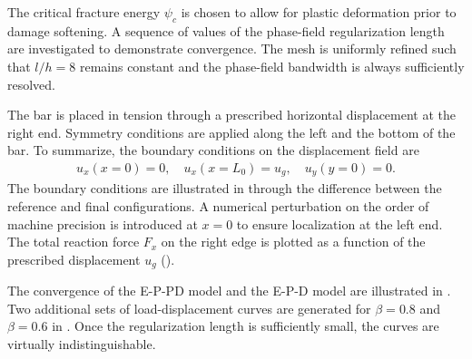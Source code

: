 The critical fracture energy $\psi_c$ is chosen to allow for plastic deformation prior to damage softening. A sequence of values of the phase-field regularization length are investigated to demonstrate convergence. The mesh is uniformly refined such that $l/h = 8$ remains constant and the phase-field bandwidth is always sufficiently resolved.



The bar is placed in tension through a prescribed horizontal displacement at the right end. Symmetry conditions are applied along the left and the bottom of the bar.  To summarize, the boundary conditions on the displacement field are
\begin{align*}
  u_x(x = 0) = 0, \quad u_x(x = L_0) = u_g, \quad u_y(y = 0) = 0.
\end{align*}
The boundary conditions are illustrated in  through the difference between the reference and final configurations. A numerical perturbation on the order of machine precision is introduced at $x=0$ to ensure localization at the left end. The total reaction force $F_x$ on the right edge is plotted as a function of the prescribed displacement $u_g$ ().

The convergence of the E-P-PD model and the E-P-D model are illustrated in .
Two additional sets of load-displacement curves are generated for $\beta = 0.8$ and $\beta = 0.6$ in . Once the regularization length is sufficiently small, the curves are virtually indistinguishable.



